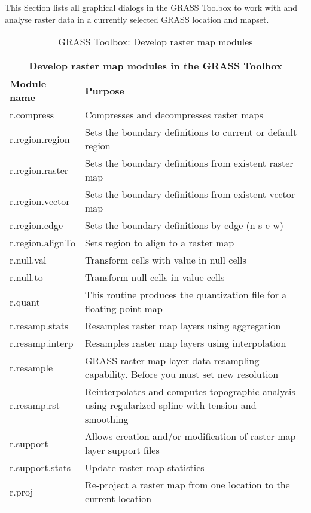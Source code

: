 This Section lists all graphical dialogs in the GRASS Toolbox to work with
and analyse raster data in a currently selected GRASS location and mapset.

\begin{table}[H]
\centering
 \begin{tabular}{|p{4cm}|p{10cm}|}
  \hline \multicolumn{2}{|c|}{\textbf{Develop raster map modules in the GRASS
  Toolbox}} \\
  \hline \textbf{Module name} & \textbf{Purpose} \\
  \hline r.compress & Compresses and decompresses raster maps \\
  \hline r.region.region & Sets the boundary definitions to current or
  default region \\
  \hline r.region.raster & Sets the boundary definitions from existent raster
  map\\
  \hline r.region.vector & Sets the boundary definitions from existent vector map \\
  \hline r.region.edge & Sets the boundary definitions by edge (n-s-e-w) \\
  \hline r.region.alignTo & Sets region to align to a raster map\\
  \hline r.null.val & Transform cells with value in null cells\\
  \hline r.null.to & Transform null cells in value cells\\
  \hline r.quant & This routine produces the quantization file for a
  floating-point map \\
  \hline r.resamp.stats & Resamples raster map layers using aggregation \\
  \hline r.resamp.interp & Resamples raster map layers using interpolation \\
  \hline r.resample & GRASS raster map layer data resampling capability.
  Before you must set new resolution\\
  \hline r.resamp.rst & Reinterpolates and computes topographic analysis
  using regularized spline with tension and smoothing \\
  \hline r.support & Allows creation and/or modification of raster map layer
  support files\\
  \hline r.support.stats & Update raster map statistics \\
  \hline r.proj & Re-project a raster map from one location to the current
  location \\
\hline
\end{tabular}
\caption{GRASS Toolbox: Develop raster map modules}
\end{table}

